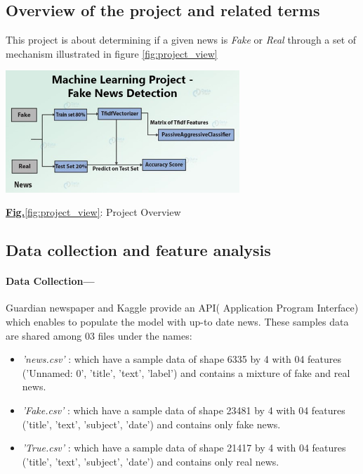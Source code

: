 \documentclass[11.5pt]{article}
\begin{document}
\begin{multicols}{2}
\subsection{Overview of the project and related terms}
This project is about determining if a given news is \textit{Fake} or \textit{Real} through a set of mechanism illustrated in figure \ref{fig:project_view}
\begin{center}
    \centering
    \includegraphics[width=8.8cm]{model.jpg}
    \caption{\underline{\textbf{Fig.}\ref{fig:project_view}}: Project Overview}
    \label{fig:project_view}
\end{center}

\subsection{Data collection and feature analysis}
\paragraph{Data Collection---}
Guardian newspaper and Kaggle provide an API( Application Program Interface) which enables to populate the model with up-to date news. These samples data are shared among 03 files under the names:
\begin{itemize}
    \item \textit{'news.csv'} : which have a sample data of shape 6335 by 4 with 04 features ('Unnamed: 0', 'title', 'text', 'label') and contains a mixture of fake and real news.
    \item \textit{'Fake.csv'} : which have a sample data of shape 23481 by 4 with 04 features ('title', 'text', 'subject', 'date') and contains only fake news.
    \item \textit{'True.csv'} : which have a sample data of shape 21417 by 4 with 04 features ('title', 'text', 'subject', 'date') and contains only real news.
\end{itemize}


\end{multicols}
\end{document}
